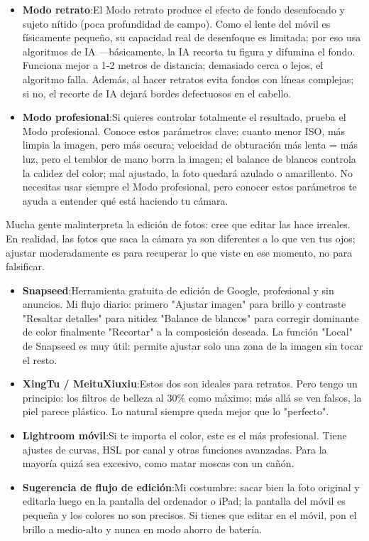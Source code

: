 \begin{itemize}
  \item \textbf{Modo retrato}:El Modo retrato produce el efecto de fondo desenfocado y sujeto nítido (poca profundidad de campo). Como el lente del móvil es físicamente pequeño, su capacidad real de desenfoque es limitada; por eso usa algoritmos de IA —básicamente, la IA recorta tu figura y difumina el fondo. Funciona mejor a 1-2 metros de distancia; demasiado cerca o lejos, el algoritmo falla. Además, al hacer retratos evita fondos con líneas complejas; si no, el recorte de IA dejará bordes defectuosos en el cabello.
  \item \textbf{Modo profesional}:Si quieres controlar totalmente el resultado, prueba el Modo profesional. Conoce estos parámetros clave: cuanto menor ISO, más limpia la imagen, pero más oscura; velocidad de obturación más lenta = más luz, pero el temblor de mano borra la imagen; el balance de blancos controla la calidez del color; mal ajustado, la foto quedará azulado o amarillento. No necesitas usar siempre el Modo profesional, pero conocer estos parámetros te ayuda a entender qué está haciendo tu cámara.
\end{itemize}


Mucha gente malinterpreta la edición de fotos: cree que editar las hace irreales. En realidad, las fotos que saca la cámara ya son diferentes a lo que ven tus ojos; ajustar moderadamente es para recuperar lo que viste en ese momento, no para falsificar.

\begin{itemize}
  \item \textbf{Snapseed}:Herramienta gratuita de edición de Google, profesional y sin anuncios. Mi flujo diario: primero "Ajustar imagen" para brillo y contraste "Resaltar detalles" para nitidez "Balance de blancos" para corregir dominante de color finalmente "Recortar" a la composición deseada. La función "Local" de Snapseed es muy útil: permite ajustar solo una zona de la imagen sin tocar el resto.
  \item \textbf{XingTu / MeituXiuxiu}:Estos dos son ideales para retratos. Pero tengo un principio: los filtros de belleza al 30\% como máximo; más allá se ven falsos, la piel parece plástico. Lo natural siempre queda mejor que lo "perfecto".
  \item \textbf{Lightroom móvil}:Si te importa el color, este es el más profesional. Tiene ajustes de curvas, HSL por canal y otras funciones avanzadas. Para la mayoría quizá sea excesivo, como matar moscas con un cañón.
  \item \textbf{Sugerencia de flujo de edición}:Mi costumbre: sacar bien la foto original y editarla luego en la pantalla del ordenador o iPad; la pantalla del móvil es pequeña y los colores no son precisos. Si tienes que editar en el móvil, pon el brillo a medio-alto y nunca en modo ahorro de batería.
\end{itemize}


